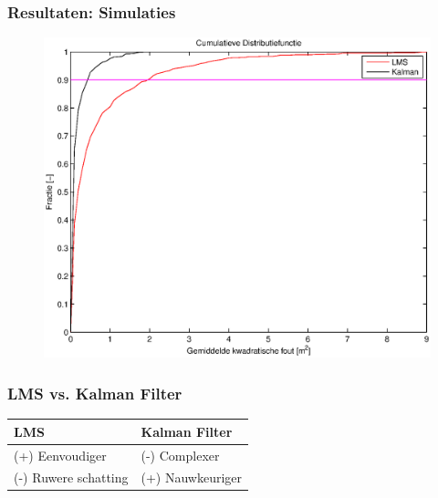 \documentclass{beamer}
\begin{document}
  \begin{frame}
    \frametitle{Resultaten: Simulaties}
    \begin{figure}
      \begin{center}
        \includegraphics[width=.6\linewidth]{images/simulatie_cumulatief.eps}
      \end{center}
    \end{figure}
  \end{frame}
  \begin{frame}
    \frametitle{LMS vs. Kalman Filter}
    \begin{tabular}{|l|l|}
      \hline
      LMS & Kalman Filter \\
      \hline
      (+) Eenvoudiger & (-) Complexer \\
      (-) Ruwere schatting & (+) Nauwkeuriger \\
      \hline
    \end{tabular}
  \end{frame}
\end{document}
